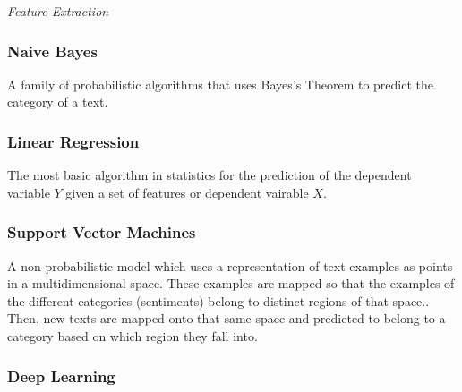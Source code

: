 \begin{algorithm}[H]
\caption{\textit{Feature Extraction}}
\label{array-sum}
\begin{algorithmic}[1]
\EndProcedure
\end{algorithmic}
\end{algorithm}
\subsubsection{Naive Bayes}
A family of probabilistic algorithms that uses Bayes's Theorem to predict the category of a text.

\subsubsection{Linear Regression}
The most basic algorithm in statistics for the prediction of the dependent variable $Y$ given a set of features or dependent vairable $X$.

\subsubsection{Support Vector Machines}
A non-probabilistic model which uses a representation of text examples as points in a multidimensional space. These examples are mapped so that the examples of the different categories (sentiments) belong to distinct regions of that space.. Then, new texts are mapped onto that same space and predicted to belong to a category based on which region they fall into.

\subsubsection{Deep Learning}



